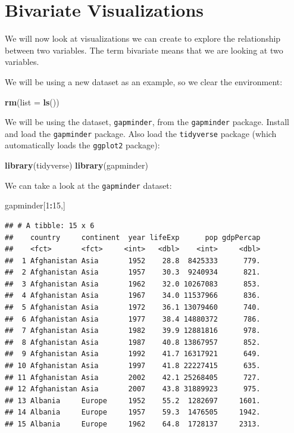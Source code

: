 \documentclass[
]{book}
\newenvironment{Shaded}{\begin{snugshade}}{\end{snugshade}}
\newcommand{\AttributeTok}[1]{\textcolor[rgb]{0.13,0.29,0.53}{#1}}
\newcommand{\DecValTok}[1]{\textcolor[rgb]{0.00,0.00,0.81}{#1}}
\newcommand{\FunctionTok}[1]{\textcolor[rgb]{0.13,0.29,0.53}{\textbf{#1}}}
\newcommand{\NormalTok}[1]{#1}
\newcommand{\SpecialCharTok}[1]{\textcolor[rgb]{0.81,0.36,0.00}{\textbf{#1}}}
\begin{document}
\hypertarget{bivariate-visualizations}{%
\section{Bivariate Visualizations}\label{bivariate-visualizations}}

We will now look at visualizations we can create to explore the relationship between two variables. The term bivariate means that we are looking at two variables.

We will be using a new dataset as an example, so we clear the environment:

\begin{Shaded}
\begin{Highlighting}[]
\FunctionTok{rm}\NormalTok{(}\AttributeTok{list =} \FunctionTok{ls}\NormalTok{())}
\end{Highlighting}
\end{Shaded}

We will be using the dataset, \texttt{gapminder}, from the \texttt{gapminder} package. Install and load the \texttt{gapminder} package. Also load the \texttt{tidyverse} package (which automatically loads the \texttt{ggplot2} package):

\begin{Shaded}
\begin{Highlighting}[]
\FunctionTok{library}\NormalTok{(tidyverse)}
\FunctionTok{library}\NormalTok{(gapminder)}
\end{Highlighting}
\end{Shaded}

We can take a look at the \texttt{gapminder} dataset:

\begin{Shaded}
\begin{Highlighting}[]
\NormalTok{gapminder[}\DecValTok{1}\SpecialCharTok{:}\DecValTok{15}\NormalTok{,]}
\end{Highlighting}
\end{Shaded}

\begin{verbatim}
## # A tibble: 15 x 6
##    country     continent  year lifeExp      pop gdpPercap
##    <fct>       <fct>     <int>   <dbl>    <int>     <dbl>
##  1 Afghanistan Asia       1952    28.8  8425333      779.
##  2 Afghanistan Asia       1957    30.3  9240934      821.
##  3 Afghanistan Asia       1962    32.0 10267083      853.
##  4 Afghanistan Asia       1967    34.0 11537966      836.
##  5 Afghanistan Asia       1972    36.1 13079460      740.
##  6 Afghanistan Asia       1977    38.4 14880372      786.
##  7 Afghanistan Asia       1982    39.9 12881816      978.
##  8 Afghanistan Asia       1987    40.8 13867957      852.
##  9 Afghanistan Asia       1992    41.7 16317921      649.
## 10 Afghanistan Asia       1997    41.8 22227415      635.
## 11 Afghanistan Asia       2002    42.1 25268405      727.
## 12 Afghanistan Asia       2007    43.8 31889923      975.
## 13 Albania     Europe     1952    55.2  1282697     1601.
## 14 Albania     Europe     1957    59.3  1476505     1942.
## 15 Albania     Europe     1962    64.8  1728137     2313.
\end{verbatim}
\end{document}
